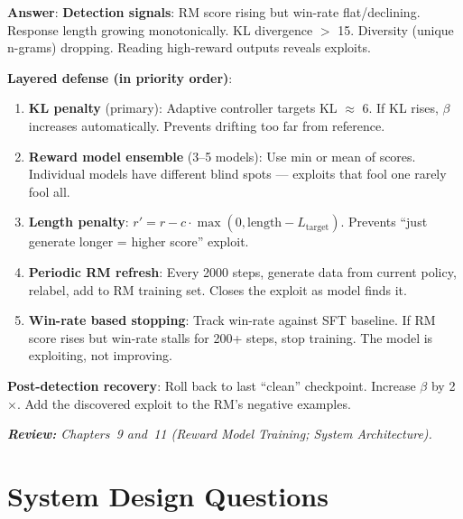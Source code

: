\begin{questionbox}
\textbf{Answer}: \textbf{Detection signals}: RM score rising but win-rate flat/declining. Response length growing monotonically. KL divergence $>$ 15. Diversity (unique n-grams) dropping. Reading high-reward outputs reveals exploits.

\textbf{Layered defense (in priority order)}:

\begin{enumerate}
  \item \textbf{KL penalty} (primary): Adaptive controller targets KL $\approx$ 6. If KL rises, $\beta$ increases automatically. Prevents drifting too far from reference.
  \item \textbf{Reward model ensemble} (3--5 models): Use min or mean of scores. Individual models have different blind spots --- exploits that fool one rarely fool all.
  \item \textbf{Length penalty}: $r' = r - c \cdot \max(0, \text{length} - L_\text{target})$. Prevents ``just generate longer = higher score'' exploit.
  \item \textbf{Periodic RM refresh}: Every 2000 steps, generate data from current policy, relabel, add to RM training set. Closes the exploit as model finds it.
  \item \textbf{Win-rate based stopping}: Track win-rate against SFT baseline. If RM score rises but win-rate stalls for 200+ steps, stop training. The model is exploiting, not improving.
\end{enumerate}

\textbf{Post-detection recovery}: Roll back to last ``clean'' checkpoint. Increase $\beta$ by 2$\times$. Add the discovered exploit to the RM’s negative examples.

\emph{\textbf{Review:} Chapters~9 and~11 (Reward Model Training; System Architecture).}
\end{questionbox}

\section{System Design Questions}
\label{system-design-questions}

